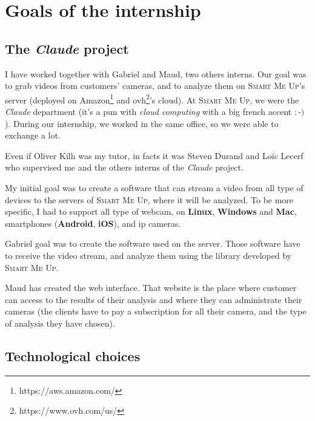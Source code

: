 \documentclass[a4paper,11pt]{custom}
\newcommand{\smu}{\textsc{Smart Me Up}\xspace}
\newcommand{\linux}{\textbf{Linux}\xspace}
\newcommand{\win}{\textbf{Windows}\xspace}
\newcommand{\mac}{\textbf{Mac}\xspace}
\newcommand{\android}{\textbf{Android}\xspace}
\newcommand{\ios}{\textbf{iOS}\xspace}
\newcommand{\claude}{\textit{Claude}\xspace}
\begin{document}
\chapter{Goals of the internship}

\section{The \claude{} project}

I have worked together with Gabriel and Maud, two others interns. Our goal was
to grab videos from customers' cameras, and to analyze them on \smu's server
(deployed on Amazon\footnote{https://aws.amazon.com/} and
ovh\footnote{https://www.ovh.com/us/}'s cloud). At \smu, we were the \claude{}
department (it's a pun with
\textit{cloud computing} with a big french accent $:$-$)$ ). During our
internship, we worked in the same office, so we were able to exchange a lot.

Even if Oliver Kilh was my tutor, in facts it was Steven Durand and Loïc Lecerf
who supervised me and the others interns of the \claude{} project.

My initial goal was to create a software that can stream a video from all type of
devices to the servers of \smu, where it will be analyzed. To be more specific,
I had to support all type of webcam, on \linux, \win{} and \mac, smartphones
(\android, \ios), and ip cameras.

Gabriel goal was to create the software used on the server. Those software
have to receive the video stream, and analyze them using the library developed
by \smu.

Maud has created the web interface. That website is the place where customer can
access to the results of their analysis and where they can administrate their
cameras (the clients have to pay a subscription for all their camera, and the
type of analysis they have chosen).

\section{Technological choices}
\end{document}
